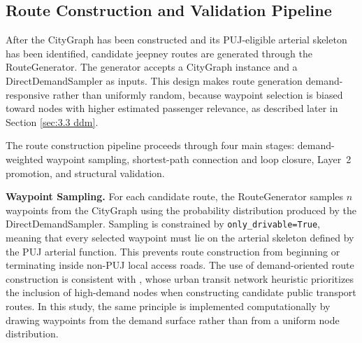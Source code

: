 {




\subsection{Route Construction and Validation Pipeline}
\label{subsec:3.2.3 route construction and validation pipeline}
After the CityGraph has been constructed and its \ac{PUJ}-eligible arterial skeleton has been identified, candidate jeepney routes are generated through the RouteGenerator. The generator accepts a CityGraph instance and a DirectDemandSampler as inputs. This design makes route generation demand-responsive rather than uniformly random, because waypoint selection is biased toward nodes with higher estimated passenger relevance, as described later in Section \ref{sec:3.3 ddm}.

The route construction pipeline proceeds through four main stages: demand-weighted waypoint sampling, shortest-path connection and loop closure, Layer~2 promotion, and structural validation.

\textbf{Waypoint Sampling.}
For each candidate route, the RouteGenerator samples $n$ waypoints from the CityGraph using the probability distribution produced by the DirectDemandSampler. Sampling is constrained by \texttt{only\_drivable=True}, meaning that every selected waypoint must lie on the arterial skeleton defined by the \ac{PUJ} arterial function. This prevents route construction from beginning or terminating inside non-\ac{PUJ} local access roads. The use of demand-oriented route construction is consistent with \cite{mandl1980}, whose urban transit network heuristic prioritizes the inclusion of high-demand nodes when constructing candidate public transport routes. In this study, the same principle is implemented computationally by drawing waypoints from the demand surface rather than from a uniform node distribution.

}
